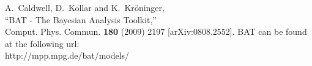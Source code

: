 \documentclass[11pt, a4paper]{article}
\begin{document}

\clearpage 
\pagebreak 

\begin{thebibliography}{99}
  A.~Caldwell, D.~Kollar and K.~Kr{\"o}ninger, \\ 
  ``BAT - The Bayesian Analysis Toolkit,'' \\ 
  Comput. Phys. Commun. {\bf 180} (2009) 2197 [arXiv:0808.2552]. 
  BAT can be found at the following url: \\ http://mpp.mpg.de/bat/models/
\end{thebibliography} 

\end{document}
